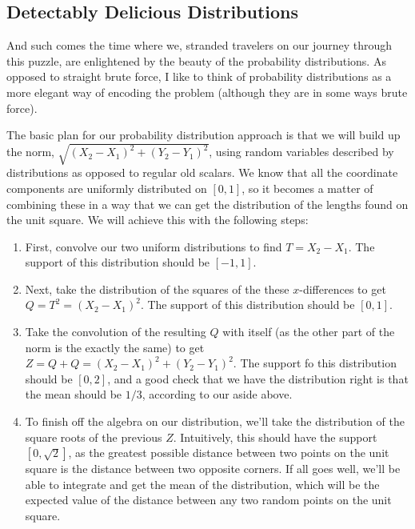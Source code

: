 

\subsection{Detectably Delicious Distributions}

And such comes the time where we, stranded travelers on our journey through
this puzzle, are enlightened by the beauty of the probability distributions. As
opposed to straight brute force, I like to think of probability distributions
as a more elegant way of encoding the problem (although they are in some ways
brute force).

The basic plan for our probability distribution approach is that we will build
up the norm, \( \sqrt{\left( X_2 - X_1 \right)^2 + \left( Y_2 - Y_1 \right)^2}
\), using random variables described by distributions as opposed to regular old
scalars. We know that all the coordinate components are uniformly distributed
on \( \left[ 0, 1 \right] \), so it becomes a matter of combining these in a
way that we can get the distribution of the lengths found on the unit square. We will achieve this with the following steps:
\begin{enumerate}
    \item First, convolve our two uniform distributions to find \( T = X_2 - X_1
        \). The support of this distribution should be \( \left[ -1, 1 \right] \).
    \item Next, take the distribution of the squares of the these \( x \)-differences to get \( Q = T^2 = \left( X_2 - X_1 \right)^2 \). The support of this distribution should be \( \left[ 0, 1 \right] \).
    \item Take the convolution of the resulting \( Q \) with itself (as the
        other part of the norm is the exactly the same) to get \( Z = Q + Q =
        \left( X_2 - X_1 \right)^2 + \left( Y_2 - Y_1 \right)^2 \). The support
        fo this distribution should be \( \left[ 0, 2 \right] \), and a good
        check that we have the distribution right is that the mean should be \(
        1 / 3 \), according to our aside above.
    \item To finish off the algebra on our distribution, we'll take the
        distribution of the square roots of the previous \( Z \).
        Intuitively, this should have the support \( \left[ 0, \sqrt{2} \right]
        \), as the greatest possible distance between two points on the unit
        square is the distance between two opposite corners. If all goes well,
        we'll be able to integrate and get the mean of the distribution, which
        will be the expected value of the distance between any two random
        points on the unit square.
\end{enumerate}


